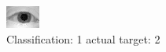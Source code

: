 \begin{figure}[h!]
\begin{center}
\includegraphics[width=0.60\columnwidth]{figures/ID946_class_1_target_2.png}
\end{center}
\caption{ Classification: 1 actual target: 2}
\label{fig:ID946_class_1_target_2}
\end{figure}
